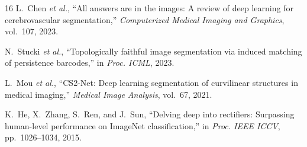 \documentclass[conference]{IEEEtran}
\begin{document}
\begin{thebibliography}{16}
L.~Chen \textit{et al.},
``All answers are in the images: A review of deep learning for cerebrovascular segmentation,''
\textit{Computerized Medical Imaging and Graphics}, vol.~107, 2023.

N.~Stucki \textit{et al.},
``Topologically faithful image segmentation via induced matching of persistence barcodes,''
in \textit{Proc. ICML}, 2023.

L.~Mou \textit{et al.},
``CS2-Net: Deep learning segmentation of curvilinear structures in medical imaging,''
\textit{Medical Image Analysis}, vol.~67, 2021.

K.~He, X.~Zhang, S.~Ren, and J.~Sun,
``Delving deep into rectifiers: Surpassing human-level performance on ImageNet classification,''
in \textit{Proc. IEEE ICCV}, pp.~1026--1034, 2015.

\end{thebibliography}
\end{document}
